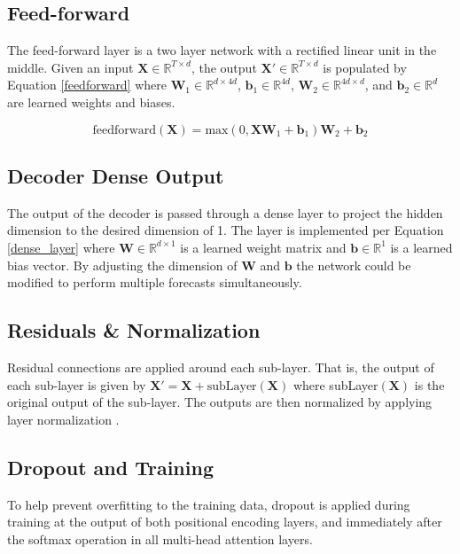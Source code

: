 \subsection{Feed-forward}
The feed-forward layer is a two layer network with a rectified linear unit in the middle.
Given an input $\boldsymbol{X} \in \mathbb{R}^{T \times d}$, the output $\boldsymbol{X'} \in \mathbb{R}^{T \times d}$ is populated by Equation \ref{feedforward} where $\boldsymbol{W}_1 \in \mathbb{R}^{d \times 4d}$, $\boldsymbol{b}_1 \in \mathbb{R}^{4d}$, $\boldsymbol{W}_2 \in \mathbb{R}^{4d \times d}$, and $\boldsymbol{b}_2 \in \mathbb{R}^{d}$ are learned weights and biases.

\begin{equation} \label{feedforward}
\text{feedforward}(\boldsymbol{X}) = \text{max}(0, \boldsymbol{X}  \boldsymbol{W}_1 + \boldsymbol{b}_1)  \boldsymbol{W}_2 + \boldsymbol{b}_2
\end{equation}

\subsection{Decoder Dense Output}
The output of the decoder is passed through a dense layer to project the hidden dimension to the desired dimension of 1.
The layer is implemented per Equation \ref{dense_layer} where $\boldsymbol{W} \in \mathbb{R}^{d \times 1}$ is a learned weight matrix and $\boldsymbol{b} \in \mathbb{R}^{1}$ is a learned bias vector.
By adjusting the dimension of $\boldsymbol{W}$ and $\boldsymbol{b}$ the network could be modified to perform multiple forecasts simultaneously.


\subsection{Residuals \& Normalization}
Residual connections \cite{He2015} are applied around each sub-layer.
That is, the output of each sub-layer is given by $\boldsymbol{X'} = \boldsymbol{X} + \text{subLayer}(\boldsymbol{X})$ where subLayer$(\boldsymbol{X})$ is the original output of the sub-layer.
The outputs are then normalized by applying layer normalization \cite{Ba2016}.

\subsection{Dropout and Training}
\label{transformer-dropout-training}
To help prevent overfitting to the training data, dropout \cite{srivastava14a} is applied during training at the output of both positional encoding layers, and immediately after the softmax operation in all multi-head attention layers.

